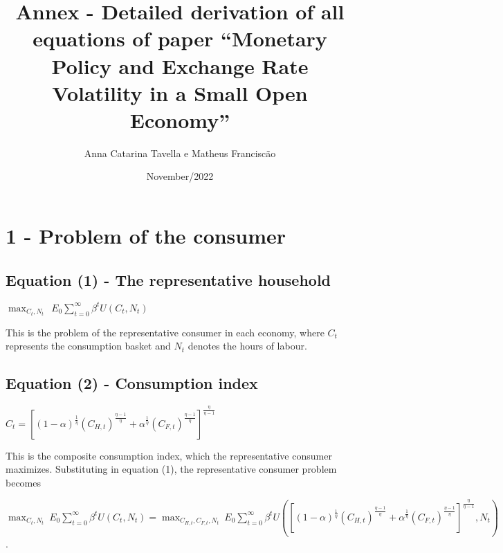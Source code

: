 \documentclass[
]{article}
\title{Annex - Detailed derivation of all equations of paper ``Monetary
Policy and Exchange Rate Volatility in a Small Open Economy''}
\author{Anna Catarina Tavella e Matheus Franciscão}
\date{November/2022}
\begin{document}
\maketitle

\hypertarget{problem-of-the-consumer}{%
\section{1 - Problem of the consumer}\label{problem-of-the-consumer}}

\vspace{12pt}

\hypertarget{equation-1---the-representative-household}{%
\subsection{Equation (1) - The representative
household}\label{equation-1---the-representative-household}}

\(\displaystyle \max_{C_t,N_t} \ \ E_0 \sum_{t=0}^\infty \beta^tU(C_t,N_t)\)

\vspace{8pt}

This is the problem of the representative consumer in each economy,
where \(C_t\) represents the consumption basket and \(N_t\) denotes the
hours of labour.

\vspace{12pt}

\hypertarget{equation-2---consumption-index}{%
\subsection{Equation (2) - Consumption
index}\label{equation-2---consumption-index}}

\(C_t=\left[ (1-\alpha)^{\frac{1}{\eta}} (C_{H,t})^{\frac{\eta-1}{\eta}} + \alpha^{\frac{1}{\eta}} (C_{F,t})^{\frac{\eta-1}{\eta}} \right]^{\frac{\eta}{\eta-1}}\)

\vspace{8pt}

This is the composite consumption index, which the representative
consumer maximizes. Substituting in equation (1), the representative
consumer problem becomes

\(\displaystyle \max_{C_t,N_t} \ E_0 \sum_{t=0}^\infty \beta^tU(C_t,N_t) = \max_{C_{H,t},C_{F,t},N_t} \ E_0 \sum_{t=0}^\infty \beta^tU \left(\left[ (1-\alpha)^{\frac{1}{\eta}} (C_{H,t})^{\frac{\eta-1}{\eta}} + \alpha^{\frac{1}{\eta}} (C_{F,t})^{\frac{\eta-1}{\eta}} \right]^{\frac{\eta}{\eta-1}},N_t \right)\).
\end{document}
